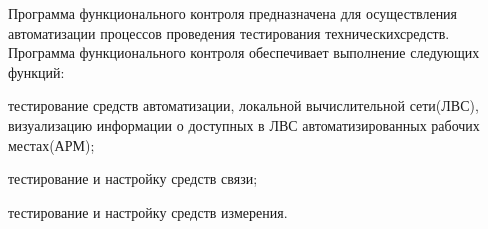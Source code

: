Программа функционального контроля предназначена для осуществления автоматизации процессов проведения тестирования
технических\break средств.
Программа функционального контроля обеспечивает выполнение следующих функций:
\begin{legal}
    \item тестирование средств автоматизации, локальной вычислительной сети(ЛВС), визуализацию информации о доступных в ЛВС автоматизированных рабочих местах(АРМ);
    \item тестирование и настройку средств связи;
    \item тестирование и настройку средств измерения.
\end{legal}
